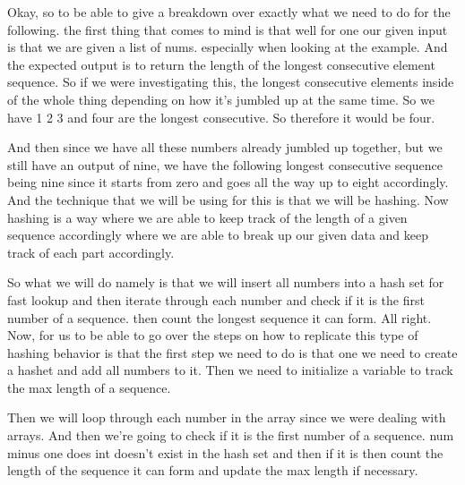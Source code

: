\expandafter\def\csname sourceexcerpt@43\endcsname{%
Okay, so to be able to give a breakdown over exactly what we need to do for the
following. the first thing that comes to mind is that well for one our given input is
that we are given a list of nums. especially when looking at the example. And the
expected output is to return the length of the longest consecutive element sequence.
So if we were investigating this, the longest consecutive elements inside of the whole
thing depending on how it's jumbled up at the same time. So we have 1 2 3 and four are
the longest consecutive. So therefore it would be four.

And then since we have all these numbers already jumbled up together, but we still
have an output of nine, we have the following longest consecutive sequence being nine
since it starts from zero and goes all the way up to eight accordingly. And the
technique that we will be using for this is that we will be hashing. Now hashing is a
way where we are able to keep track of the length of a given sequence accordingly
where we are able to break up our given data and keep track of each part accordingly.

So what we will do namely is that we will insert all numbers into a hash set for fast
lookup and then iterate through each number and check if it is the first number of a
sequence. then count the longest sequence it can form. All right. Now, for us to be
able to go over the steps on how to replicate this type of hashing behavior is that
the first step we need to do is that one we need to create a hashet and add all
numbers to it. Then we need to initialize a variable to track the max length of a
sequence.

Then we will loop through each number in the array since we were dealing with arrays.
And then we're going to check if it is the first number of a sequence. num minus one
does int doesn't exist in the hash set and then if it is then count the length of the
sequence it can form and update the max length if necessary.
}

